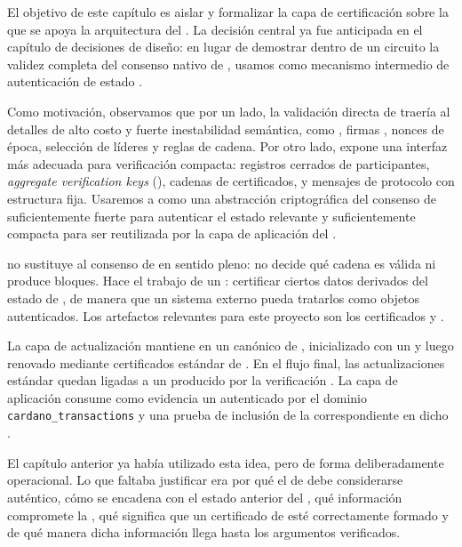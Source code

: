 
El objetivo de este capítulo es aislar y formalizar la capa de certificación sobre la que se apoya la arquitectura del \zkBridge. La decisión central ya fue anticipada en el capítulo de decisiones de diseño: en lugar de demostrar dentro de un circuito \ZK la validez completa del consenso nativo de \Cardano, usamos \Mithril como mecanismo intermedio de autenticación de estado \cite{cryptoeprint:2021/916,MithrilDocsOverview}.

Como motivación, observamos que por un lado, la validación directa de \Praos traería al \zkBridge detalles de alto costo y fuerte inestabilidad semántica, como \VRF, firmas \KES, nonces de época, selección de líderes y reglas de cadena. Por otro lado, \Mithril expone una interfaz más adecuada para verificación compacta: registros cerrados de participantes, \textit{aggregate verification keys} (\AVK), cadenas de certificados, y mensajes de protocolo con estructura fija. Usaremos a \Mithril como una abstracción criptográfica del consenso de \Cardano suficientemente fuerte para autenticar el estado relevante y suficientemente compacta para ser reutilizada por la capa de aplicación del \zkBridge.

\Mithril no sustituye al consenso de \Cardano en sentido pleno: no decide qué cadena es válida ni produce bloques. Hace el trabajo de un \LightClient: certificar ciertos datos derivados del estado de \Cardano, de manera que un sistema externo pueda tratarlos como objetos autenticados. Los artefactos relevantes para este proyecto son los certificados \StakeDistribution y \TransactionSnapshot \cite{MithrilDocsCertChain,MithrilDocsClient}.

La capa de actualización mantiene en \ChainB un \UTxO canónico de \StakeDistribution, inicializado con un \GenesisCertificate y luego renovado mediante certificados estándar de \Mithril. En el flujo final, las actualizaciones estándar quedan ligadas a un \ProofReceipt producido por la verificación \STM. La capa de aplicación consume como evidencia un \TransactionSnapshotCertificate autenticado por el dominio \texttt{cardano\_transactions} y una prueba de inclusión de la \LockTx correspondiente en dicho \TransactionSnapshotCertificate.

El capítulo anterior ya había utilizado esta idea, pero de forma deliberadamente operacional. Lo que faltaba justificar era por qué el \UTxO de \StakeDistribution debe considerarse auténtico, cómo se encadena con el estado anterior del \UTxO, qué información compromete la \AVK, qué significa que un certificado de \Mithril esté correctamente formado y de qué manera dicha información llega hasta los argumentos \ZK verificados.

